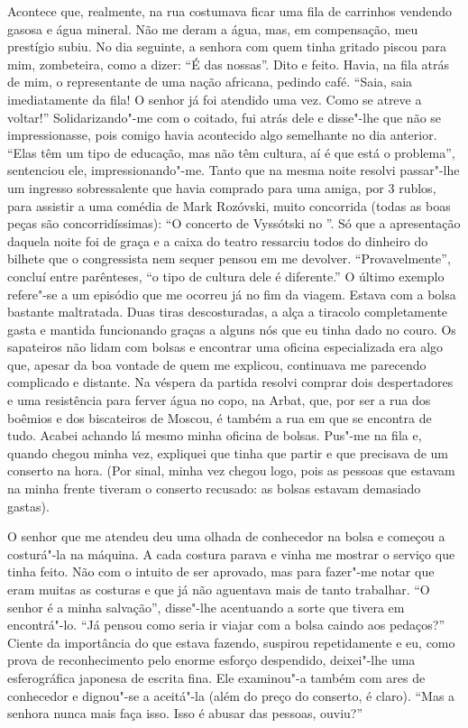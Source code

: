 Acontece que, realmente, na rua costumava ficar uma fila de carrinhos vendendo gasosa e água mineral. Não me deram a água, mas, em
compensação, meu prestígio subiu. No dia seguinte, a senhora com quem tinha gritado piscou para mim, zombeteira, como a dizer: ``É das nossas''. Dito e feito. Havia, na fila atrás de mim, o representante de uma nação africana, pedindo café. ``Saia, saia imediatamente da fila! O senhor já foi atendido uma vez. Como se atreve a voltar!'' Solidarizando"-me com o coitado, fui atrás dele e disse"-lhe que não se impressionasse, pois comigo havia acontecido algo semelhante no dia anterior. ``Elas têm um tipo de educação, mas não têm cultura, aí é que está o problema'', sentenciou ele, impressionando"-me. Tanto que na mesma noite resolvi
passar"-lhe um ingresso sobressalente que havia comprado para uma amiga, por 3 rublos, para assistir a uma comédia de Mark Rozóvski, muito concorrida (todas as boas peças são concorridíssimas): ``O concerto de Vyssótski no ''. Só que a apresentação daquela noite foi de graça e a caixa do teatro ressarciu todos do dinheiro do bilhete que o congressista nem sequer pensou em me devolver. ``Provavelmente'', concluí entre parênteses, ``o tipo de cultura dele é diferente.'' O último exemplo refere"-se a um episódio que me ocorreu já no fim da viagem. Estava com a bolsa bastante maltratada. Duas tiras descosturadas, a alça a tiracolo completamente gasta e mantida funcionando graças a alguns nós que eu tinha dado no couro. Os sapateiros não lidam com bolsas e encontrar uma oficina especializada era algo que, apesar da boa vontade de quem me explicou, continuava me parecendo complicado e distante. Na véspera da partida resolvi comprar dois despertadores e uma resistência para ferver água no copo, na Arbat, que, por ser a rua dos boêmios e dos biscateiros de Moscou, é também a rua em que se encontra de tudo. Acabei achando lá mesmo minha oficina de bolsas. Pus"-me na fila e, quando chegou minha vez, expliquei que tinha que partir e que precisava de um conserto na hora. (Por sinal, minha vez chegou logo, pois as pessoas que estavam na minha frente tiveram o conserto recusado: as bolsas estavam demasiado gastas).

O senhor que me atendeu deu uma olhada de conhecedor na bolsa e começou a costurá"-la na máquina. A cada costura parava e vinha me mostrar o serviço que tinha feito. Não com o intuito de ser aprovado, mas para fazer"-me notar que eram muitas as costuras e que já não aguentava mais de tanto trabalhar. ``O senhor é a minha salvação'', disse"-lhe acentuando a sorte que tivera em encontrá"-lo. ``Já pensou como seria ir viajar com a bolsa caindo aos pedaços?'' Ciente da importância do que estava fazendo, suspirou repetidamente e eu, como prova de reconhecimento pelo enorme esforço despendido, deixei"-lhe uma esferográfica japonesa de escrita fina. Ele examinou"-a também com ares de conhecedor e dignou"-se a aceitá"-la (além do preço do conserto, é claro). ``Mas a senhora nunca mais faça isso. Isso é abusar das pessoas, ouviu?''

